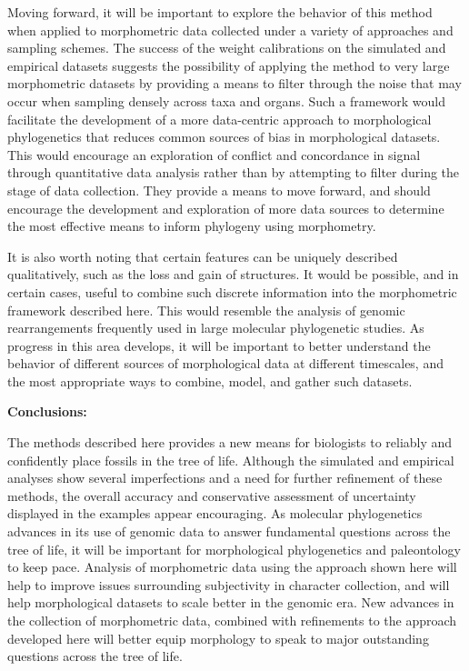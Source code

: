 \documentclass[12pt]{article}
\begin{document}
Moving forward, it will be important to explore the behavior of this
method when applied to morphometric data collected under a variety of
approaches and sampling schemes. The success of the weight calibrations
on the simulated and empirical datasets suggests the possibility of
applying the method to very large morphometric datasets by providing a
means to filter through the noise that may occur when  sampling
densely across taxa and organs. Such a framework would facilitate the
development of a more data-centric approach to morphological
phylogenetics that reduces common sources of bias in morphological 
datasets. This would encourage an exploration of conflict and
concordance in signal through quantitative data analysis rather than by
attempting to filter during the stage of data collection. They provide
a means to move forward, and should encourage the development and
exploration of more data sources to determine the most effective means
to inform phylogeny using morphometry.

It is also worth noting that certain features can be uniquely described qualitatively, such as the loss and gain of structures. 
It would be possible, and in certain cases, useful to combine such discrete information into the morphometric framework described here. This would resemble the analysis of genomic rearrangements frequently used in large molecular phylogenetic studies. As progress in this area develops, it will be important to better understand the behavior of different sources of morphological data at different timescales, and the most appropriate ways to combine, model, and gather such datasets.

\noindent\textbf{Conclusions:}

The methods described here provides a new means for biologists to
reliably and confidently place fossils in the tree of life. Although the
simulated and empirical analyses show several imperfections and a need
for further refinement of these methods, the overall accuracy and
conservative assessment of uncertainty displayed in the examples appear
encouraging. As molecular phylogenetics advances in its use of genomic
data to answer fundamental questions across the tree of life, it will be
important for morphological phylogenetics and paleontology to keep pace.
Analysis of morphometric data using the approach shown here will help to
improve issues surrounding subjectivity in character collection, and
will help morphological datasets to scale better in the genomic era. New
advances in the collection of morphometric data, combined with
refinements to the approach developed here will better equip morphology
to speak to major outstanding questions across the tree of life.


\newpage


%

\newpage



\newpage
\end{document}

